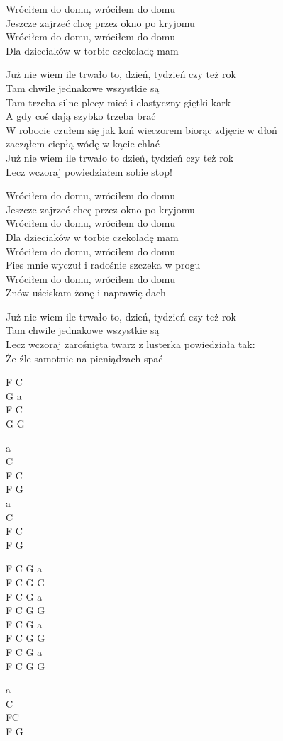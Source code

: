 \begin{text}
    Wróciłem do domu, wróciłem do domu\\
    Jeszcze zajrzeć chcę przez okno po kryjomu\\
    Wróciłem do domu, wróciłem do domu\\
    Dla dzieciaków w torbie czekoladę mam

    Już nie wiem ile trwało to, dzień, tydzień czy też rok\\
    Tam chwile jednakowe wszystkie są\\
    Tam trzeba silne plecy mieć i elastyczny giętki kark\\
    A gdy coś dają szybko trzeba brać\\
    W robocie czułem się jak koń wieczorem biorąc zdjęcie w dłoń\\
    zacząłem ciepłą wódę w kącie chlać\\
    Już nie wiem ile trwało to dzień, tydzień czy też rok\\
    Lecz wczoraj powiedziałem sobie stop!

    Wróciłem do domu, wróciłem do domu\\
    Jeszcze zajrzeć chcę przez okno po kryjomu\\
    Wróciłem do domu, wróciłem do domu\\
    Dla dzieciaków w torbie czekoladę mam\\
    Wróciłem do domu, wróciłem do domu\\
    Pies mnie wyczuł i radośnie szczeka w progu\\
    Wróciłem do domu, wróciłem do domu\\
    Znów uściskam żonę i naprawię dach

    Już nie wiem ile trwało to, dzień, tydzień czy też rok\\
    Tam chwile jednakowe wszystkie są\\
    Lecz wczoraj zarośnięta twarz z lusterka powiedziała tak:\\
    Że źle samotnie na pieniądzach spać


\end{text}
\begin{chord}
    F C\\
    G a\\
    F C\\
    G G

    a\\
    C\\
    F C\\
    F G\\
    a\\
    C\\
    F C\\
    F G

    F C G a\\
    F C G G\\
    F C G a\\
    F C G G\\
    F C G a\\
    F C G G\\
    F C G a\\
    F C G G

    a\\
    C\\
    FC\\
    F G

\end{chord}